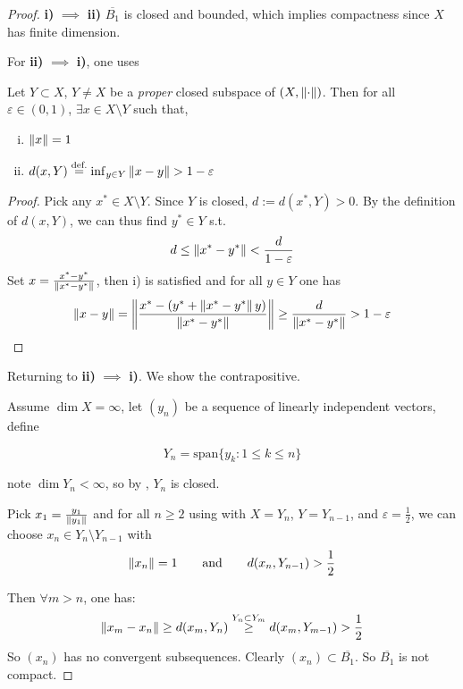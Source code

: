 \documentclass{article}
\begin{document}
\begin{proof}
    \textbf{i)} $\implies$ \textbf{ii)} $\overline{B_1}$ is closed and bounded, which implies compactness since $X$ has finite dimension.  
    
    For \textbf{ii)} $\implies$ \textbf{i)}, one uses    
    
\begin{lemma}[Riesz]\nextline
\label{riesz unit ball lemma}
    Let $Y \subset X$, $Y\neq X$ be a \textit{proper} closed subspace of $(X, \left\|{\cdot}\right\|)$. Then for all $\varepsilon \in (0,1)$, $\exists x \in X\setminus Y$ such that,  
    \begin{enumerate}[i)]
        \item $\left\|{x}\right\|=1$
        \item $d(x, Y) \overset{\text{def.}}{=} \inf_{y\in Y} \left\|{x-y}\right\| > 1- \varepsilon$
    \end{enumerate}
\end{lemma}  
\begin{proof}
    Pick any $x^* \in X\setminus Y$. Since $Y$ is closed, $d:=d(x^*, Y)>0$.  
    By the definition of $d(x,Y)$, we can thus find $y^* \in Y$ s.t.  
    $$
    d \leq \left\|{x^*-y^*}\right\| < \frac{d}{1-\varepsilon}
    $$  
    Set $x = \frac{x^*-y^*}{\left\|{x^*-y^*}\right\|}$, then i) is satisfied and for all $y\in Y$ one has  
    $$
    \left\|{x-y}\right\| = \left\|{\frac{x^*-(y^*+\left\|{x^*-y^*}\right\|y)}{\left\|{x^*-y^*}\right\|}}\right\|
    \geq \frac{d}{\left\|{x^*-y^*}\right\|} > 1-\varepsilon
    $$
\end{proof}

Returning to  \textbf{ii)} $\implies$ \textbf{i)}. We show the contrapositive. 

Assume $\dim X=\infty$, let $(y_n)$ be a sequence of linearly independent vectors, define

$$Y_n = \text{span} \{y_k: 1\leq k\leq n\} $$

note $\dim Y_n < \infty$, so by , $Y_n$ is closed.  

Pick $x_1 = \frac{y_1}{\left\|{y_1}\right\|}$ and for all $n \geq 2$ using  with $X=Y_n$, $Y=Y_{n-1}$, and $\varepsilon=\frac{1}{2}$, we can choose $x_n \in Y_n \setminus Y_{n-1}$ with 
$$\left\|{x_n}\right\|=1 \qquad \text{and} \qquad d(x_n, Y_{n-1})>\frac{1}{2}$$

Then $\forall m > n$, one has:  
$$
\left\|{x_m-x_n}\right\| \geq d(x_m, Y_n) \overset{Y_n \subset Y_m}{\geq} d(x_m, Y_{m-1}) > \frac{1}{2}
$$  
So $(x_n)$ has no convergent subsequences. Clearly $(x_n) \subset \overline{B_1} $. So $\overline{B_1} $ is not compact.  
\end{proof}
\end{document}

